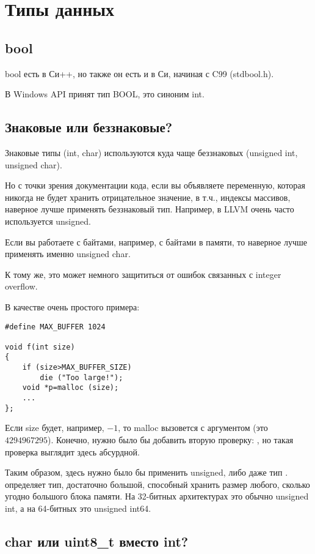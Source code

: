 ﻿\section{Типы данных}

\subsection{bool}

bool есть в Си++, но также он есть и в Си, начиная с C99 (stdbool.h).

В Windows API принят тип BOOL, это синоним int.

\subsection{Знаковые или беззнаковые?}

Знаковые типы (int, char) используются куда чаще беззнаковых (unsigned int, unsigned char).

Но с точки зрения документации кода, если вы объявляете переменную, которая никогда не будет хранить отрицательное
значение, в т.ч., индексы массивов, наверное лучше применять беззнаковый тип.
Например, в LLVM очень часто используется unsigned.

Если вы работаете с байтами, например, с байтами в памяти, то наверное лучше применять именно unsigned char.

К тому же, это может немного защититься от ошибок связанных с integer overflow\cite{Phrack3C0A}.

В качестве очень простого примера:

\begin{lstlisting}
#define MAX_BUFFER 1024

void f(int size)
{
	if (size>MAX_BUFFER_SIZE)
		die ("Too large!");
	void *p=malloc (size);
	...
};
\end{lstlisting}

Если size будет, например, $-1$, то malloc вызовется с аргументом  (это $4294967295$).
Конечно, нужно было бы добавить вторую проверку: , но такая проверка выглядит здесь абсурдной.

Таким образом, здесь нужно было бы применить unsigned, либо даже тип . 
 определяет тип, достаточно большой,
способный хранить размер любого, сколько угодно большого блока памяти.
На 32-битных архитектурах это обычно unsigned int,
а на 64-битных это unsigned int64.

\subsection{char или uint8\_t вместо int?}

